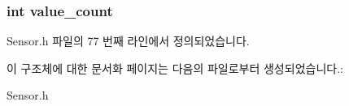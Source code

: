 \hypertarget{struct___ultra_violet__data_a40a079bfc72408819dc78da308203a74}{
\subsubsection[{value\-\_\-count}]{\setlength{\rightskip}{0pt plus 5cm}int value\-\_\-count}}\label{struct___ultra_violet__data_a40a079bfc72408819dc78da308203a74}


Sensor.\-h 파일의 77 번째 라인에서 정의되었습니다.



이 구조체에 대한 문서화 페이지는 다음의 파일로부터 생성되었습니다.\-:\begin{DoxyCompactItemize}
\item 
Sensor.\-h\end{DoxyCompactItemize}

